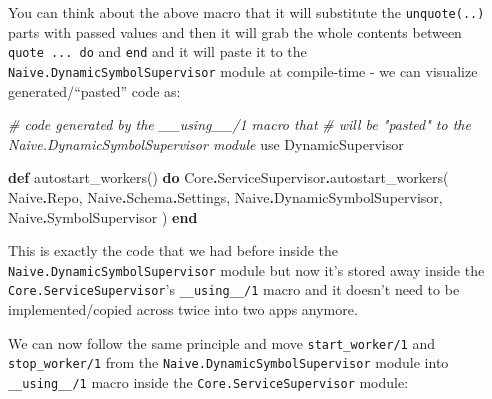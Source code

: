 \documentclass[
]{book}
\newenvironment{Shaded}{\begin{snugshade}}{\end{snugshade}}
\newcommand{\CommentTok}[1]{\textcolor[rgb]{0.56,0.35,0.01}{\textit{#1}}}
\newcommand{\ConstantTok}[1]{\textcolor[rgb]{0.00,0.00,0.00}{#1}}
\newcommand{\ImportTok}[1]{#1}
\newcommand{\KeywordTok}[1]{\textcolor[rgb]{0.13,0.29,0.53}{\textbf{#1}}}
\newcommand{\NormalTok}[1]{#1}
\newcommand{\OperatorTok}[1]{\textcolor[rgb]{0.81,0.36,0.00}{\textbf{#1}}}
\begin{document}
You can think about the above macro that it will substitute the \texttt{unquote(..)} parts with passed values and then it will grab the whole contents between \texttt{quote\ ...\ do} and \texttt{end} and it will paste it to the \texttt{Naive.DynamicSymbolSupervisor} module at compile-time - we can visualize generated/``pasted'' code as:

\begin{Shaded}
\begin{Highlighting}[]
  \CommentTok{\# code generated by the \textasciigrave{}\_\_using\_\_/1\textasciigrave{} macro that}
  \CommentTok{\# will be "pasted" to the \textasciigrave{}Naive.DynamicSymbolSupervisor\textasciigrave{} module}
  \ImportTok{use} \ConstantTok{DynamicSupervisor}

  \KeywordTok{def}\NormalTok{ autostart\_workers() }\KeywordTok{do}
    \ConstantTok{Core}\OperatorTok{.}\ConstantTok{ServiceSupervisor}\OperatorTok{.}\NormalTok{autostart\_workers(}
      \ConstantTok{Naive}\OperatorTok{.}\ConstantTok{Repo}\NormalTok{,}
      \ConstantTok{Naive}\OperatorTok{.}\ConstantTok{Schema}\OperatorTok{.}\ConstantTok{Settings}\NormalTok{,}
      \ConstantTok{Naive}\OperatorTok{.}\ConstantTok{DynamicSymbolSupervisor}\NormalTok{,}
      \ConstantTok{Naive}\OperatorTok{.}\ConstantTok{SymbolSupervisor}
\NormalTok{    )}
  \KeywordTok{end}
\end{Highlighting}
\end{Shaded}

This is exactly the code that we had before inside the \texttt{Naive.DynamicSymbolSupervisor} module but now it's stored away inside the \texttt{Core.ServiceSupervisor}'s \texttt{\_\_using\_\_/1} macro and it doesn't need to be implemented/copied across twice into two apps anymore.

We can now follow the same principle and move \texttt{start\_worker/1} and \texttt{stop\_worker/1} from the \texttt{Naive.DynamicSymbolSupervisor} module into \texttt{\_\_using\_\_/1} macro inside the \texttt{Core.ServiceSupervisor} module:
\end{document}
